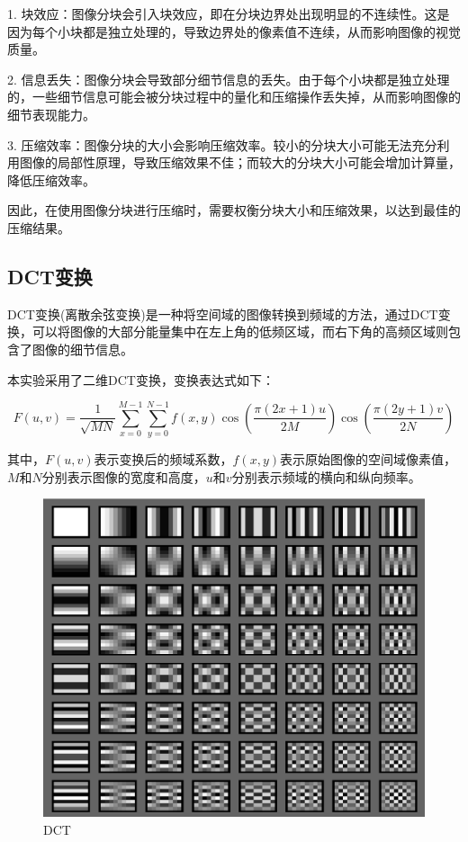 \documentclass{article}
\begin{document}
1. 块效应：图像分块会引入块效应，即在分块边界处出现明显的不连续性。这是因为每个小块都是独立处理的，导致边界处的像素值不连续，从而影响图像的视觉质量。

2. 信息丢失：图像分块会导致部分细节信息的丢失。由于每个小块都是独立处理的，一些细节信息可能会被分块过程中的量化和压缩操作丢失掉，从而影响图像的细节表现能力。

3. 压缩效率：图像分块的大小会影响压缩效率。较小的分块大小可能无法充分利用图像的局部性原理，导致压缩效果不佳；而较大的分块大小可能会增加计算量，降低压缩效率。

因此，在使用图像分块进行压缩时，需要权衡分块大小和压缩效果，以达到最佳的压缩结果。

\subsection{DCT变换}

DCT变换(离散余弦变换)是一种将空间域的图像转换到频域的方法，通过DCT变换，可以将图像的大部分能量集中在左上角的低频区域，而右下角的高频区域则包含了图像的细节信息。

本实验采用了二维DCT变换，变换表达式如下：

\[
F(u,v) = \frac{1}{\sqrt{MN}} \sum_{x=0}^{M-1} \sum_{y=0}^{N-1} f(x,y) \cos\left(\frac{\pi(2x+1)u}{2M}\right) \cos\left(\frac{\pi(2y+1)v}{2N}\right)
\]

其中，$F(u,v)$表示变换后的频域系数，$f(x,y)$表示原始图像的空间域像素值，$M$和$N$分别表示图像的宽度和高度，$u$和$v$分别表示频域的横向和纵向频率。

\FloatBarrier
\begin{figure}[htbp]
    \centering
    \begin{minipage}[t]{0.45\textwidth}
        \centering
        \includegraphics[width=\textwidth]{assets/DCT.png}
        \caption{DCT}
        \label{fig:DCT}
    \end{minipage}
\end{figure}
\FloatBarrier
\end{document}
